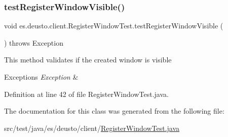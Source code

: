 \mbox{\label{classes_1_1deusto_1_1client_1_1_register_window_test_a7aa05237597943e612504c032609486e}} 
\subsubsection{\texorpdfstring{test\+Register\+Window\+Visible()}{testRegisterWindowVisible()}}
{\footnotesize\ttfamily void es.\+deusto.\+client.\+Register\+Window\+Test.\+test\+Register\+Window\+Visible (\begin{DoxyParamCaption}{ }\end{DoxyParamCaption}) throws Exception}

This method validates if the created window is visible 
\begin{DoxyExceptions}{Exceptions}
{\em Exception} & \\
\hline
\end{DoxyExceptions}


Definition at line 42 of file Register\+Window\+Test.\+java.



The documentation for this class was generated from the following file\+:\begin{DoxyCompactItemize}
\item 
src/test/java/es/deusto/client/\hyperlink{_register_window_test_8java}{Register\+Window\+Test.\+java}\end{DoxyCompactItemize}
